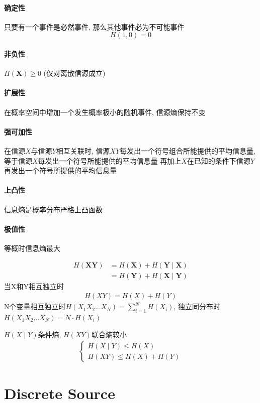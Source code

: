 \documentclass[a4paper]{report}
\begin{document}
\paragraph{确定性}
只要有一个事件是必然事件, 那么其他事件必为不可能事件
$$H(1,0)=0$$
\paragraph{非负性}
$H(\textbf{X})\geq 0$ (仅对离散信源成立)
\paragraph{扩展性}
在概率空间中增加一个发生概率极小的随机事件, 信源熵保持不变
\paragraph{强可加性}
在信源$X$与信源$Y$相互关联时, 信源$XY$每发出一个符号组合所能提供的平均信息量, 
等于信源$X$每发出一个符号所能提供的平均信息量
再加上$X$在已知的条件下信源$Y$再发出一个符号所提供的平均信息量
\paragraph{上凸性}
信息熵是概率分布严格上凸函数
\paragraph{极值性}
等概时信息熵最大

\begin{align*}
  H(\textbf{XY})&=H(\textbf{X})+H(\textbf{Y}\mid \textbf{X})\\
  &=H(\textbf{Y})+H(\textbf{X}\mid \textbf{Y})
\end{align*}
当X和Y相互独立时
\begin{align*}
  H(XY)=H(X)+H(Y)
\end{align*}
N个变量相互独立时$H(X_1X_2\dots X_N)=\displaystyle\sum_{i=1}^{N}H(X_i)$, 
独立同分布时$H(X_1X_2\dots X_N)=N\cdot H(X_i)$

$H(X\mid Y)$条件熵, $H(XY)$联合熵较小
\begin{align*}
  \begin{cases}
    H(X\mid Y)\leq H(X)\\
    H(XY)\leq H(X)+H(Y)
  \end{cases}
\end{align*}





\section{Discrete Source}
\end{document}
